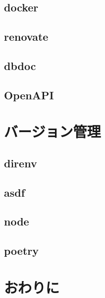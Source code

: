 \subsection{docker}
\subsection{renovate}
\subsection{dbdoc}
\subsection{OpenAPI}

\section{バージョン管理}

\subsection{direnv}
\subsection{asdf}
\subsection{node}
\subsection{poetry}

\section{おわりに}